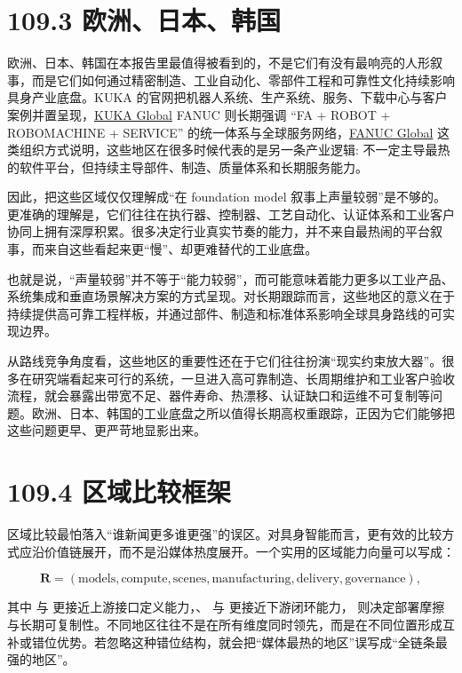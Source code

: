 \section*{109.3 欧洲、日本、韩国}


欧洲、日本、韩国在本报告里最值得被看到的，不是它们有没有最响亮的人形叙事，而是它们如何通过精密制造、工业自动化、零部件工程和可靠性文化持续影响具身产业底盘。KUKA 的官网把机器人系统、生产系统、服务、下载中心与客户案例并置呈现，\href{https://www.kuka.com/}{KUKA Global} FANUC 则长期强调 “FA + ROBOT + ROBOMACHINE + SERVICE” 的统一体系与全球服务网络，\href{https://www.fanuc.com/}{FANUC Global} 这类组织方式说明，这些地区在很多时候代表的是另一条产业逻辑: 不一定主导最热的软件平台，但持续主导部件、制造、质量体系和长期服务能力。

因此，把这些区域仅仅理解成“在 foundation model 叙事上声量较弱”是不够的。更准确的理解是，它们往往在执行器、控制器、工艺自动化、认证体系和工业客户协同上拥有深厚积累。很多决定行业真实节奏的能力，并不来自最热闹的平台叙事，而来自这些看起来更“慢”、却更难替代的工业底盘。

也就是说，“声量较弱”并不等于“能力较弱”，而可能意味着能力更多以工业产品、系统集成和垂直场景解决方案的方式呈现。对长期跟踪而言，这些地区的意义在于持续提供高可靠工程样板，并通过部件、制造和标准体系影响全球具身路线的可实现边界。

从路线竞争角度看，这些地区的重要性还在于它们往往扮演“现实约束放大器”。很多在研究端看起来可行的系统，一旦进入高可靠制造、长周期维护和工业客户验收流程，就会暴露出带宽不足、器件寿命、热漂移、认证缺口和运维不可复制等问题。欧洲、日本、韩国的工业底盘之所以值得长期高权重跟踪，正因为它们能够把这些问题更早、更严苛地显影出来。

\section*{109.4 区域比较框架}


区域比较最怕落入“谁新闻更多谁更强”的误区。对具身智能而言，更有效的比较方式应沿价值链展开，而不是沿媒体热度展开。一个实用的区域能力向量可以写成：

\begingroup
\scriptsize
\begin{equation*}
\mathbf{R} =
(\text{models}, \text{compute}, \text{scenes}, \text{manufacturing}, \text{delivery}, \text{governance}),
\end{equation*}
\endgroup

其中 \texttt{} 与 \texttt{} 更接近上游接口定义能力，\texttt{}、\texttt{} 与 \texttt{} 更接近下游闭环能力，\texttt{} 则决定部署摩擦与长期可复制性。不同地区往往不是在所有维度同时领先，而是在不同位置形成互补或错位优势。若忽略这种错位结构，就会把“媒体最热的地区”误写成“全链条最强的地区”。

